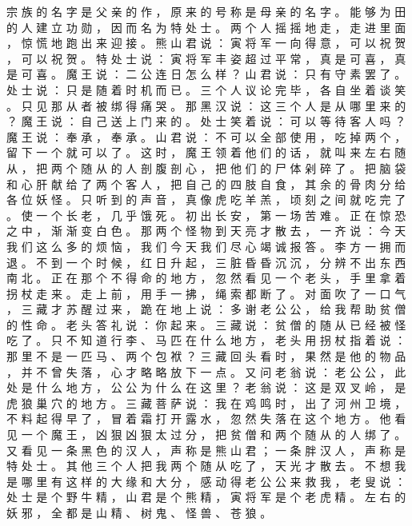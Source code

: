 {宗 族 的 名 字 是 父 亲 的 作 ， 原 来 的 号 称 是 母 亲 的 名 字 。
能 够 为 田 的 人 建 立 功 勋 ， 因 而 名 为 特 处 士 。
两 个 人 摇 摇 地 走 ， 走 进 里 面 ， 惊 慌 地 跑 出 来 迎 接 。
熊 山 君 说 ： 寅 将 军 一 向 得 意 ， 可 以 祝 贺 ， 可 以 祝 贺 。
特 处 士 说 ： 寅 将 军 丰 姿 超 过 平 常 ， 真 是 可 喜 ， 真 是 可 喜 。
魔 王 说 ： 二 公 连 日 怎 么 样 ？ 山 君 说 ： 只 有 守 素 罢 了 。
处 士 说 ： 只 是 随 着 时 机 而 已 。
三 个 人 议 论 完 毕 ， 各 自 坐 着 谈 笑 。
只 见 那 从 者 被 绑 得 痛 哭 。
那 黑 汉 说 ： 这 三 个 人 是 从 哪 里 来 的 ？ 魔 王 说 ： 自 己 送 上 门 来 的 。
处 士 笑 着 说 ： 可 以 等 待 客 人 吗 ？ 魔 王 说 ： 奉 承 ， 奉 承 。
山 君 说 ： 不 可 以 全 部 使 用 ， 吃 掉 两 个 ， 留 下 一 个 就 可 以 了 。
这 时 ， 魔 王 领 着 他 们 的 话 ， 就 叫 来 左 右 随 从 ， 把 两 个 随 从 的 人 剖 腹 剖 心 ， 把 他 们 的 尸 体 剁 碎 了 。 把 脑 袋 和 心 肝 献 给 了 两 个 客 人 ， 把 自 己 的 四 肢 自 食 ， 其 余 的 骨 肉 分 给 各 位 妖 怪 。
只 听 到 的 声 音 ， 真 像 虎 吃 羊 羔 ， 顷 刻 之 间 就 吃 完 了 。
使 一 个 长 老 ， 几 乎 饿 死 。
初 出 长 安 ， 第 一 场 苦 难 。
正 在 惊 恐 之 中 ， 渐 渐 变 白 色 。
那 两 个 怪 物 到 天 亮 才 散 去 ， 一 齐 说 ： 今 天 我 们 这 么 多 的 烦 恼 ， 我 们 今 天 我 们 尽 心 竭 诚 报 答 。
李 方 一 拥 而 退 。
不 到 一 个 时 候 ， 红 日 升 起 ， 三 脏 昏 昏 沉 沉 ， 分 辨 不 出 东 西 南 北 。
正 在 那 个 不 得 命 的 地 方 ， 忽 然 看 见 一 个 老 头 ， 手 里 拿 着 拐 杖 走 来 。
走 上 前 ， 用 手 一 拂 ， 绳 索 都 断 了 。
对 面 吹 了 一 口 气 ， 三 藏 才 苏 醒 过 来 ， 跪 在 地 上 说 ： 多 谢 老 公 公 ， 给 我 帮 助 贫 僧 的 性 命 。
老 头 答 礼 说 ： 你 起 来 。
三 藏 说 ： 贫 僧 的 随 从 已 经 被 怪 吃 了 。
只 不 知 道 行 李 、 马 匹 在 什 么 地 方 ， 老 头 用 拐 杖 指 着 说 ： 那 里 不 是 一 匹 马 、 两 个 包 袱 ？ 三 藏 回 头 看 时 ， 果 然 是 他 的 物 品 ， 并 不 曾 失 落 ， 心 才 略 略 放 下 一 点 。
又 问 老 翁 说 ： 老 公 公 ， 此 处 是 什 么 地 方 ， 公 公 为 什 么 在 这 里 ？ 老 翁 说 ： 这 是 双 叉 岭 ， 是 虎 狼 巢 穴 的 地 方 。
三 藏 菩 萨 说 ： 我 在 鸡 鸣 时 ， 出 了 河 州 卫 境 ， 不 料 起 得 早 了 ， 冒 着 霜 打 开 露 水 ， 忽 然 失 落 在 这 个 地 方 。
他 看 见 一 个 魔 王 ， 凶 狠 凶 狠 太 过 分 ， 把 贫 僧 和 两 个 随 从 的 人 绑 了 。
又 看 见 一 条 黑 色 的 汉 人 ， 声 称 是 熊 山 君 ； 一 条 胖 汉 人 ， 声 称 是 特 处 士 。
其 他 三 个 人 把 我 两 个 随 从 吃 了 ， 天 光 才 散 去 。
不 想 我 是 哪 里 有 这 样 的 大 缘 和 大 分 ， 感 动 得 老 公 公 来 救 我 ， 老 叟 说 ： 处 士 是 个 野 牛 精 ， 山 君 是 个 熊 精 ， 寅 将 军 是 个 老 虎 精 。
左 右 的 妖 邪 ， 全 都 是 山 精 、 树 鬼 、 怪 兽 、 苍 狼 。
}
